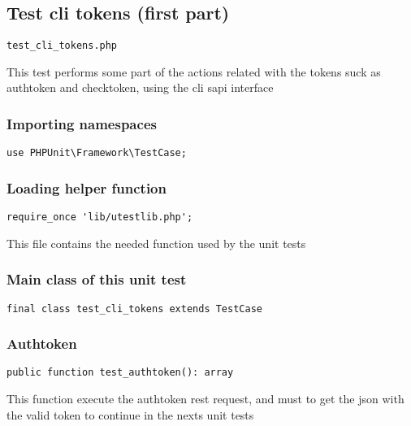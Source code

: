 \documentclass[a4paper]{article}
\begin{document}
\hypertarget{toc83}{}
\subsection{Test cli tokens (first part)}

\begin{lstlisting}
test_cli_tokens.php
\end{lstlisting}

This test performs some part of the actions related with the tokens suck
as authtoken and checktoken, using the cli sapi interface

\hypertarget{toc84}{}
\subsubsection{Importing namespaces}

\begin{lstlisting}
use PHPUnit\Framework\TestCase;
\end{lstlisting}

\hypertarget{toc85}{}
\subsubsection{Loading helper function}

\begin{lstlisting}
require_once 'lib/utestlib.php';
\end{lstlisting}

This file contains the needed function used by the unit tests

\hypertarget{toc86}{}
\subsubsection{Main class of this unit test}

\begin{lstlisting}
final class test_cli_tokens extends TestCase
\end{lstlisting}

\hypertarget{toc87}{}
\subsubsection{Authtoken}

\begin{lstlisting}
public function test_authtoken(): array
\end{lstlisting}

This function execute the authtoken rest request, and must to get the
json with the valid token to continue in the nexts unit tests
\end{document}
